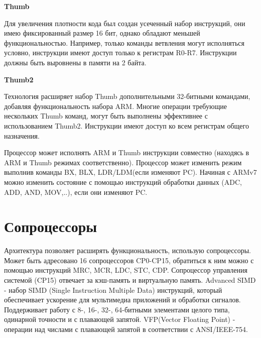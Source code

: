 {\bf Thumb}

Для увеличения плотности кода был создан усеченный набор инструкций, они имею фиксированный размер 16 бит, однако обладают меньшей функциональностью. Например, только команды ветвления могут исполняться условно, инструкции имеют доступ только к регистрам R0-R7. Инструкции должны быть выровнены в памяти на 2 байта.

{\bf Thumb2}

Технология расширяет набор Thumb дополнительными 32-битными командами, добавляя функциональность набора ARM. Многие операции требующие нескольких Thumb команд, могут быть выполнены эффективнее с использованием Thumb2. Инструкции имеют доступ ко всем регистрам общего назначения.

Процессор может исполнять ARM и Thumb инструкции совместно (находясь в ARM и Thumb режимах соответственно). Процессор может изменить режим выполнив команды BX, BLX, LDR/LDM(если изменяют PC). Начиная с ARMv7 можно изменить состояние с помощью инструкций обработки данных (ADC, ADD, AND, MOV,..), если они изменяют PC.

\section{Сопроцессоры}

Архитектура позволяет расширять функциональность, использую сопроцессоры. Может быть адресовано 16 сопроцессоров CP0-CP15, обратиться к ним можно с помощью инструкций MRC, MCR, LDC, STC, CDP. Сопроцессор управления системой (CP15) отвечает за кэш-память и виртуальную память.
Advanced SIMD - набор SIMD (Single Instruction Multiple Data) инструкций, который обеспечивает ускорение для мультимедиа приложений и обработки сигналов. Поддерживает работу с 8-, 16-, 32-, 64-битными элементами целого типа, одинарной точности и с плавающей запятой. VFP(Vector Floating Point) - операции над числами с плавающей запятой в соответствии с ANSI/IEEE-754.




